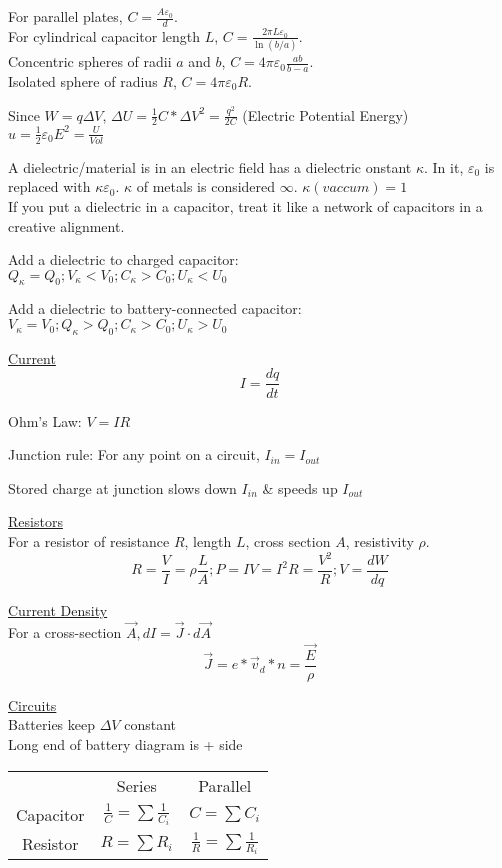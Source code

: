 \documentclass[8pt]{minimal}
\begin{document}
For parallel plates, $C = \frac{A \varepsilon_0}{d}$.\\
For cylindrical capacitor length $L$, $C = \frac{2\pi L\varepsilon_0}{\ln(b/a)}$.\\
Concentric spheres of radii $a$ and $b$, $C = 4\pi\varepsilon_0\frac{ab}{b - a}$.\\
Isolated sphere of radius $R$, $C = 4\pi\varepsilon_0 R$.

Since $W = q\Delta V$, $\Delta U = \frac{1}{2}C*\Delta V^2 = \frac{q^2}{2C}$ (Electric Potential Energy)\\
$u = \frac{1}{2}\varepsilon_0 E^2 = \frac{U}{Vol}$

A dielectric/material is in an electric field has a dielectric onstant $\kappa$.
In it, $\varepsilon_0$ is replaced with $\kappa\varepsilon_0$.
$\kappa$ of metals is considered $\infty$. $\kappa(vaccum) = 1$\\
If you put a dielectric in a capacitor, treat it like a network of capacitors in a creative alignment.

Add a dielectric to charged capacitor: \\\(Q_\kappa = Q_0; V_\kappa < V_0; C_\kappa > C_0; U_\kappa < U_0\)

Add a dielectric to battery-connected capacitor: \\\(V_\kappa = V_0; Q_\kappa > Q_0; C_\kappa > C_0; U_\kappa > U_0\)


\underline{Current}
\[ I = \frac{dq}{dt} \]

Ohm's Law: $V = IR$

Junction rule: For any point on a circuit, $I_{in} = I_{out}$

Stored charge at junction slows down $I_{in}$ \& speeds up $I_{out}$

\underline{Resistors}\\
For a resistor of resistance $R$, length $L$, cross section $A$, resistivity $\rho$.
\[ R = \frac{V}{I} = \rho\frac{L}{A}; P = IV = I^2 R = \frac{V^2}{R}; V = \frac{dW}{dq} \]

\underline{Current Density}\\
For a cross-section $\vec{A}, dI = \vec{J} \cdot d\vec{A}$
\[\vec{J} = e*\vec{v}_d*n = \frac{\vec{E}}{\rho}\]


\underline{Circuits}\\
Batteries keep $\Delta V$ constant\\
Long end of battery diagram is + side\\
\begin{tabular}[width=\textwidth]{| c | c | c |}
                &Series                             &Parallel\\
    Capacitor   &$\frac{1}{C} = \sum \frac{1}{C_i}$ &$C = \sum C_i$\\
    Resistor    &$R = \sum R_i$                     &$\frac{1}{R} = \sum \frac{1}{R_i}$
\end{tabular}
\end{document}
